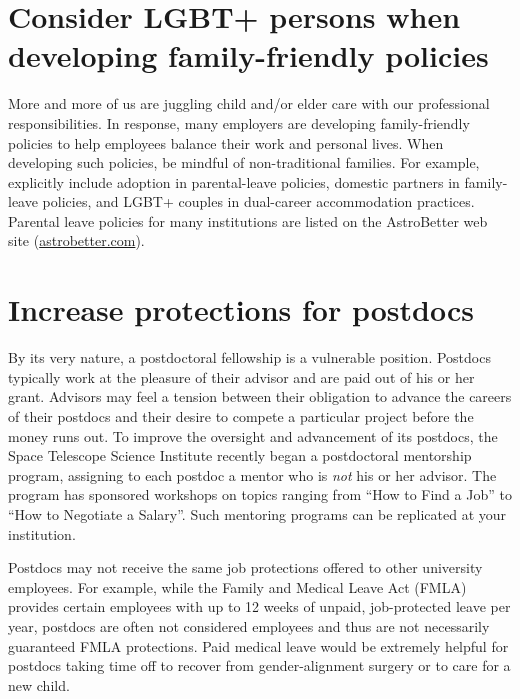 \section {Consider LGBT+ persons when developing family-friendly policies}
\label{families}
More and more of us are juggling child and/or elder care with our professional responsibilities.  In response, many employers are developing family-friendly policies to help employees balance their work and personal lives.  When developing such policies, be mindful of non-traditional families.  For example, explicitly include adoption in parental-leave policies, domestic partners in family-leave policies, and LGBT+ couples in dual-career accommodation practices.    Parental leave policies for many institutions are listed on the AstroBetter web site (\href{http://www.astrobetter.com/wiki/tiki-index.php?page=Leave+Policies}{astrobetter.com}).


\section {Increase protections for postdocs}
\label{post-docs}

By its very nature, a postdoctoral fellowship is a vulnerable position.  Postdocs typically work at the pleasure of their advisor and are paid out of his or her grant.  Advisors may feel a tension between their obligation to advance the careers of their postdocs and their desire to compete a particular project before the money runs out.  To improve the oversight and advancement of its postdocs, the Space Telescope Science Institute recently began a postdoctoral mentorship program, assigning to each postdoc a mentor who is \emph{not} his or her advisor.  The program has sponsored workshops on topics ranging from ``How to Find a Job'' to ``How to Negotiate a Salary''.  Such mentoring programs can be replicated at your institution.

Postdocs may not receive the same job protections offered to other university employees.  For example, while the Family and Medical Leave Act (FMLA) provides certain employees with up to 12 weeks of unpaid, job-protected leave per year, postdocs are often not considered employees and thus are not necessarily guaranteed FMLA protections.  Paid medical leave would be extremely helpful for postdocs taking time off to recover from gender-alignment surgery or to care for a new child.


